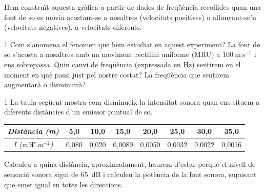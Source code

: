 Hem construït aquesta gràfica a partir de dades de freqüència recollides quan una font de so es movia acostant-se a nosaltres (velocitats positives) o allunyant-se'n (velocitats negatives), a velocitats diferents.


\begin{apartat}{1}
Com s'anomena el fenomen que hem estudiat en aquest experiment? La font de so s'acosta a nosaltres amb un moviment rectilini uniforme (MRU) a $100\ \mathrm{m\,s^{-1}}$ i ens sobrepassa. Quin canvi de freqüència (expressada en Hz) sentirem en el moment en què passi just pel nostre costat? La freqüència que sentirem augmentarà o disminuirà?
\end{apartat}

\begin{apartat}{1}
La taula següent mostra com disminueix la intensitat sonora quan ens situem a diferents distàncies d'un emissor puntual de so.

\begin{center}
\begin{tabular}{|c|c|c|c|c|c|c|c|}
\hline
\textit{Distància (m)} & 5,0 & 10,0 & 15,0 & 20,0 & 25,0 & 30,0 & 35,0\\
\hline
\textit{I (mW m$^{-2}$)} & 0,080 & 0,020 & 0,0089 & 0,0050 & 0,0032 & 0,0022 & 0,0016\\
\hline
\end{tabular}
\end{center}

Calculeu a quina distància, aproximadament, haurem d'estar perquè el nivell de sensació sonora sigui de 65~dB i calculeu la potència de la font sonora, suposant que emet igual en totes les direccions.
\end{apartat}


